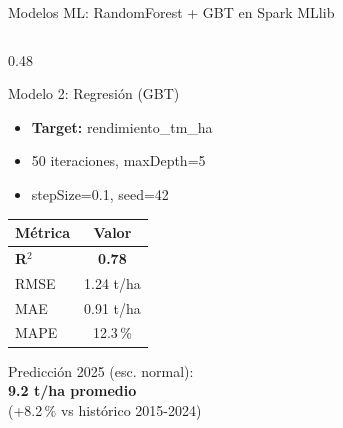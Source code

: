 \documentclass[14pt,aspectratio=169]{beamer}
\begin{document}
\begin{frame}[fragile]{Modelos ML: RandomForest + GBT en Spark MLlib}
\begin{columns}[T]
    \begin{column}{0.48\textwidth}
      \begin{block}{Modelo 2: Regresi\'on (GBT)}
        \begin{itemize}\footnotesize
          \item \textbf{Target:} rendimiento\_tm\_ha
          \item 50 iteraciones, maxDepth=5
          \item stepSize=0.1, seed=42
        \end{itemize}
      \end{block}
      \vspace{0.3em}
      \begin{tabular}{lc}
        \toprule
        M\'etrica & Valor \\
        \midrule
        \rowcolor{agroclear!70}\textbf{R$^2$} & \textbf{0.78} \\
        RMSE & 1.24 t/ha \\
        MAE & 0.91 t/ha \\
        MAPE & 12.3\,\% \\
        \bottomrule
      \end{tabular}
      \vspace{0.3em}
      \begin{alertblock}{}
        \centering\footnotesize
        Predicci\'on 2025 (esc. normal):\\
        \textbf{9.2 t/ha promedio}\\
        (+8.2\,\% vs hist\'orico 2015-2024)
      \end{alertblock}
    \end{column}
  \end{columns}
\end{frame}
\end{document}
